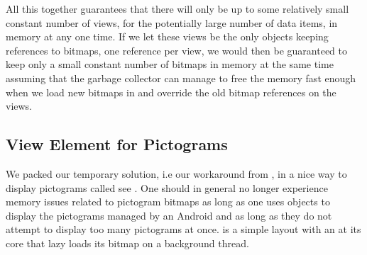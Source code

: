 All this together guarantees that there will only be up to some relatively small constant number of views, for the potentially large number of data items, in memory at any one time. If we let these views be the only objects keeping references to bitmaps, one reference per view, we would then be guaranteed to keep only a small constant number of bitmaps in memory at the same time assuming that the garbage collector can manage to free the memory fast enough when we load new bitmaps in and override the old bitmap references on the views. 

\subsection{View Element for Pictograms}
We packed our temporary solution, i.e our workaround from , in a nice way to display pictograms called  see . One should in general no longer experience memory issues related to pictogram bitmaps as long as one uses  objects to display the pictograms managed by an Android  and as long as they do not attempt to display too many pictograms at once.  is a simple layout with an  at its core that lazy loads its bitmap on a background thread.
